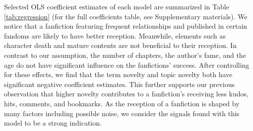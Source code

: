 \documentclass[a4paper]{article}
\begin{document}
Selected OLS coefficient estimates of each model are summarized in Table \ref{tab:regression} (for the full coefficients table, see Supplementary materials). We notice that a fanfiction featuring frequent relationships and published in certain fandoms are likely to have better reception. Meanwhile, elements such as character death and mature contents are not beneficial to their reception. In contrast to our assumption, the number of chapters, the author's fame, and the age do not have significant influence on the fanfictions' success. After controlling for these effects, we find that the term novelty and topic novelty both have significant negative coefficient estimates. This further supports our previous observation that higher novelty contributes to a fanfiction's receiving less kudos, hits, comments, and bookmarks. As the reception of a fanfiction is shaped by many factors including possible noise, we consider the signals found with this model to be a strong indication.
\end{document}
